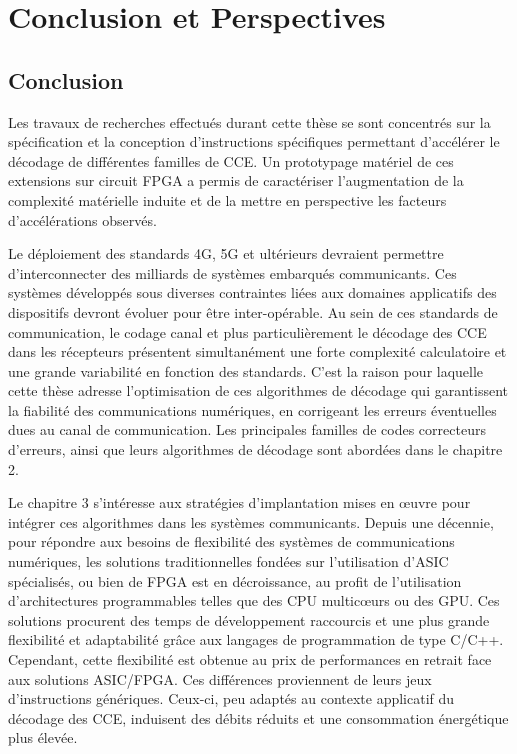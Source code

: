 \documentclass[../main.tex]{subfiles}
\begin{document}

\setmainfont{Latin Modern Roman}
\setmonofont{Latin Modern Math}

\chapter{Conclusion et Perspectives} 
\label{chapter:conclusion}


\section*{Conclusion}
Les travaux de recherches effectués durant cette thèse se sont concentrés sur la spécification et la conception d'instructions spécifiques permettant d’accélérer le décodage de différentes familles de CCE. 
Un prototypage matériel de ces extensions sur circuit FPGA a permis de caractériser l’augmentation de la complexité matérielle induite et de la mettre en perspective les facteurs d'accélérations observés.

Le déploiement des standards 4G, 5G et ultérieurs devraient permettre d’interconnecter des milliards de systèmes embarqués communicants. 
Ces systèmes développés sous diverses contraintes liées aux domaines applicatifs des dispositifs devront évoluer pour être inter-opérable. 
Au sein de ces standards de communication, le codage canal et plus particulièrement le décodage des CCE dans les récepteurs présentent simultanément une forte complexité calculatoire et une grande variabilité en fonction des standards.
C’est la raison pour laquelle cette thèse adresse l’optimisation de ces algorithmes de décodage qui garantissent la fiabilité des communications numériques, en corrigeant les erreurs éventuelles dues au canal de communication. 
Les principales familles de codes correcteurs d’erreurs, ainsi que leurs algorithmes de décodage sont abordées dans le chapitre 2.

Le chapitre 3 s’intéresse aux stratégies d’implantation mises en œuvre pour intégrer ces algorithmes dans les systèmes communicants. 
Depuis une décennie, pour répondre aux besoins de flexibilité des systèmes de communications numériques, les solutions traditionnelles fondées sur l’utilisation d’ASIC spécialisés, ou bien de FPGA est en décroissance, au profit de l’utilisation d’architectures programmables telles que des CPU multicœurs ou des GPU. 
Ces solutions procurent des temps de développement raccourcis et une plus grande flexibilité et adaptabilité grâce aux langages de programmation de type C/C++. 
Cependant, cette flexibilité est obtenue au prix de performances en retrait face aux solutions ASIC/FPGA. 
Ces différences proviennent de leurs jeux d’instructions génériques. 
Ceux-ci, peu adaptés au contexte applicatif du décodage des CCE, induisent des débits réduits et une consommation énergétique plus élevée.
\end{document}
